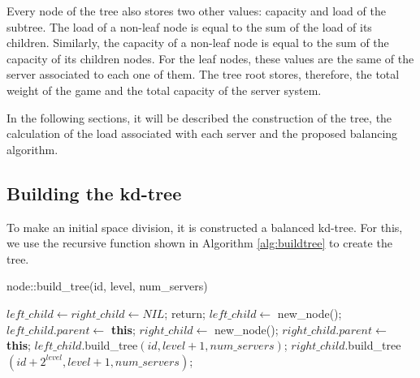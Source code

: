 \documentclass[acmtocl]{acmtrans2m}
\begin{document}
Every node of the tree also stores two other values: capacity and load of the subtree. The load of a non-leaf node is equal to the sum of the load of its children. Similarly, the capacity of a non-leaf node is equal to the sum of the capacity of its children nodes. For the leaf nodes, these values are the same of the server associated to each one of them. The tree root stores, therefore, the total weight of the game and the total capacity of the server system.

In the following sections, it will be described the construction of the tree, the calculation of the load associated with each server and the proposed balancing algorithm.

\subsection{Building the kd-tree}

To make an initial space division, it is constructed a balanced kd-tree. For this, we use the recursive function shown in Algorithm \ref{alg:buildtree} to create the tree.

\begin{algorithm}
\caption{node::build\_tree(id, level, num\_servers)}
\label{alg:buildtree}
\begin{algorithmic}
		\STATE $left\_child \leftarrow right\_child \leftarrow NIL$;
		\STATE return;
	\ELSE
		\STATE $left\_child \leftarrow$ new\_node();
		\STATE $left\_child.parent \leftarrow$ \textbf{this};
		\STATE $right\_child \leftarrow$ new\_node();
		\STATE $right\_child.parent \leftarrow$ \textbf{this};
		\STATE $left\_child$.build\_tree$(id, level + 1, num\_servers)$;
		\STATE $right\_child$.build\_tree$(id + 2^{level}, level + 1, num\_servers)$;
	\ENDIF
\end{algorithmic}
\end{algorithm}
\end{document}
